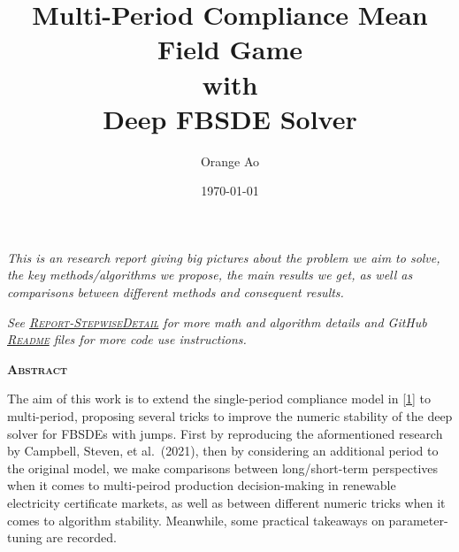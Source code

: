 \documentclass{article}
\begin{document}
\pagestyle{fancy}
\fancyhf{}

\title{
    \textbf{\huge
        Multi-Period Compliance Mean Field Game \\
        with \\
        Deep FBSDE Solver}}

\Large\selectfont
\medskip
\author{Orange Ao}
\date{\today}
\maketitle

\hline

\vspace{30pt}

\large
\textit{
This is an research report giving big pictures about the problem we aim
to solve, the key methods/algorithms we propose, the main results we
get, as well as comparisons between different methods and consequent
results.
}

\vspace{20pt}

\textit{
See \href{https://github.com/OrangeAoo/PA-MFG-FBSDE/blob/f95ab0c9c54fb68cb3517f975ac3aa2fb8b3d429/FinalReports/Report-StepwiseDetail.md}{\textsc{Report-StepwiseDetail}} for more math and algorithm details and GitHub \href{https://github.com/OrangeAoo/PA-MFG-FBSDE/blob/3cffc5e8dbe09fbc880f6c2c70d76e0b6a1b8c3c/2Period/Joint_Optim_2Prdx1/README.md}{\textsc{Readme}} files for more code use instructions.
}

\vfill
\newpage

\setlength{\parindent}{0pt}
\testpar
\Large\textbf{\textsc{Abstract}} \\

\vspace{8pt}

\normalsize The aim of this work is to extend the single-period compliance model in
\href{\%22https://doi.org/10.48550/arXiv.2110.01127\%22}{{[}1{]}} to
multi-period, proposing several tricks to improve the numeric stability of the deep solver for FBSDEs with jumps. First by reproducing the aformentioned research by Campbell, Steven, et al.~(2021), then by considering an additional period to the original model, we make comparisons between long/short-term perspectives when it comes to multi-peirod production decision-making in renewable electricity certificate markets, as well as between different numeric tricks when it comes to algorithm stability. Meanwhile, some practical takeaways on parameter-tuning are recorded.
\end{document}
